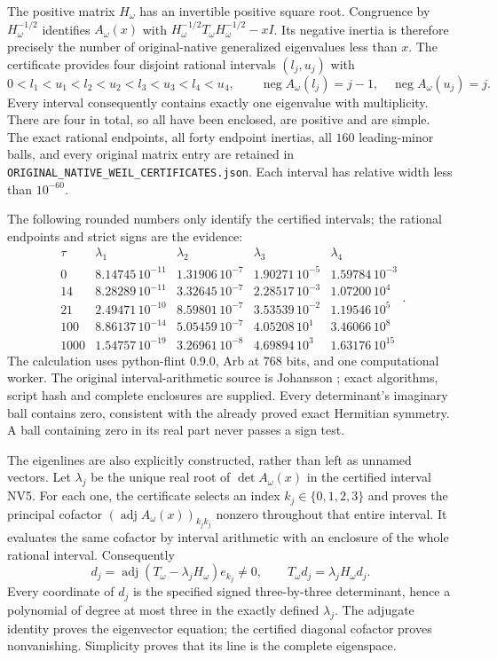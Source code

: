 \documentclass[11pt]{article}
\begin{document}
The positive matrix $H_\omega$ has an invertible positive
square root. Congruence by $H_\omega^{-1/2}$ identifies
$A_\omega(x)$ with $H_\omega^{-1/2}T_\omega H_\omega^{-1/2}-xI$.
Its negative inertia is therefore precisely the number
of original-native generalized eigenvalues less than $x$.
The certificate provides four disjoint rational intervals
$(l_j,u_j)$ with
\[
 0<l_1<u_1<l_2<u_2<l_3<u_3<l_4<u_4,\qquad
 \operatorname{neg}A_\omega(l_j)=j-1,\quad
 \operatorname{neg}A_\omega(u_j)=j.
 \tag{NV5}
\]
Every interval consequently contains exactly one eigenvalue
with multiplicity. There are four in total, so all have
been enclosed, are positive and are simple.
The exact rational endpoints, all forty endpoint inertias,
all $160$ leading-minor balls, and every original matrix
entry are retained in
\texttt{ORIGINAL\_NATIVE\_WEIL\_CERTIFICATES.json}.
Each interval has relative width less than $10^{-60}$.

The following rounded numbers only identify the certified
intervals; the rational endpoints and strict signs are
the evidence:
\[
\begin{array}{c|rrrr}
 \tau&\lambda_1&\lambda_2&\lambda_3&\lambda_4\\\hline
 0&8.14745\,10^{-11}&1.31906\,10^{-7}&1.90271\,10^{-5}&1.59784\,10^{-3}\\
 14&8.28289\,10^{-11}&3.32645\,10^{-7}&2.28517\,10^{-3}&1.07200\,10^{4}\\
 21&2.49471\,10^{-10}&8.59801\,10^{-7}&3.53539\,10^{-2}&1.19546\,10^{5}\\
 100&8.86137\,10^{-14}&5.05459\,10^{-7}&4.05208\,10^{1}&3.46066\,10^{8}\\
 1000&1.54757\,10^{-19}&3.26961\,10^{-8}&4.69894\,10^{3}&1.63176\,10^{15}
\end{array}.
\tag{NV6}
\]
The calculation uses python-flint 0.9.0, Arb at $768$ bits,
and one computational worker. The original interval-arithmetic
source is Johansson \cite{JohanssonArb}; exact algorithms,
script hash and complete enclosures are supplied. Every
determinant's imaginary ball contains zero, consistent
with the already proved exact Hermitian symmetry. A ball
containing zero in its real part never passes a sign test.

The eigenlines are also explicitly constructed, rather than
left as unnamed vectors. Let $\lambda_j$ be the unique
real root of $\det A_\omega(x)$ in the certified interval
NV5. For each one, the certificate selects an index
$k_j\in\{0,1,2,3\}$ and proves the principal cofactor
$(\operatorname{adj}A_\omega(x))_{k_jk_j}$ nonzero
throughout that entire interval. It evaluates the same
cofactor by interval arithmetic with an enclosure of
the whole rational interval. Consequently
\[
 d_j=\operatorname{adj}(T_\omega-\lambda_jH_\omega)e_{k_j}
 \ne0,\qquad
 T_\omega d_j=\lambda_jH_\omega d_j.
 \tag{NV7}
\]
Every coordinate of $d_j$ is the specified signed
three-by-three determinant, hence a polynomial of degree
at most three in the exactly defined $\lambda_j$.
The adjugate identity proves the eigenvector equation;
the certified diagonal cofactor proves nonvanishing.
Simplicity proves that its line is the complete eigenspace.
\end{document}
